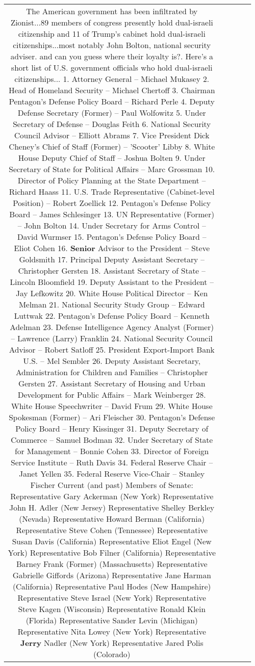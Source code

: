 \documentclass[11pt]{article}
\newlength\mylength
\begin{document}
\begin{center}
\begin{longtable}{|C{.65\mylength}|C{.30\mylength}|C{.12\mylength}|C{.12\mylength}|C{.12\mylength}|}
  \small The American government has been infiltrated by Zionist...89 members of congress presently hold dual-israeli citizenship and 11 of Trump's cabinet hold dual-israeli citizenships...most notably John Bolton, national security adviser. and can you guess where their loyalty is?. Here's a short list of U.S. government officials who hold dual-israeli citizenships... 1. Attorney General – Michael Mukasey 2. Head of Homeland Security – Michael Chertoff 3. Chairman Pentagon's Defense Policy Board – Richard Perle 4. Deputy Defense Secretary (Former) – Paul Wolfowitz 5. Under Secretary of Defense – Douglas Feith 6. National Security Council Advisor – Elliott Abrams 7. Vice President Dick Cheney's Chief of Staff (Former) – 'Scooter' Libby 8. White House Deputy Chief of Staff – Joshua Bolten 9. Under Secretary of State for Political Affairs – Marc Grossman 10. Director of Policy Planning at the State Department – Richard Haass 11. U.S. Trade Representative (Cabinet-level Position) – Robert Zoellick 12. Pentagon's Defense Policy Board – James Schlesinger 13. UN Representative (Former) – John Bolton 14. Under Secretary for Arms Control – David Wurmser 15. Pentagon's Defense Policy Board – Eliot Cohen 16. \textbf{Senior} Advisor to the President – Steve Goldsmith 17. Principal Deputy Assistant Secretary – Christopher Gersten 18. Assistant Secretary of State – Lincoln Bloomfield 19. Deputy Assistant to the President – Jay Lefkowitz 20. White House Political Director – Ken Melman 21. National Security Study Group – Edward Luttwak 22. Pentagon's Defense Policy Board – Kenneth Adelman 23. Defense Intelligence Agency Analyst (Former) – Lawrence (Larry) Franklin 24. National Security Council Advisor – Robert Satloff 25. President Export-Import Bank U.S. – Mel Sembler 26. Deputy Assistant Secretary, Administration for Children and Families – Christopher Gersten 27. Assistant Secretary of Housing and Urban Development for Public Affairs – Mark Weinberger 28. White House Speechwriter – David Frum 29. White House Spokesman (Former) – Ari Fleischer 30. Pentagon's Defense Policy Board – Henry Kissinger 31. Deputy Secretary of Commerce – Samuel Bodman 32. Under Secretary of State for Management – Bonnie Cohen 33. Director of Foreign Service Institute – Ruth Davis 34. Federal Reserve Chair – Janet Yellen 35. Federal Reserve Vice-Chair – Stanley Fischer Current (and past) Members of Senate: Representative Gary Ackerman (New York) Representative John H. Adler (New Jersey) Representative Shelley Berkley (Nevada) Representative Howard Berman (California) Representative Steve Cohen (Tennessee) Representative Susan Davis (California) Representative Eliot Engel (New York) Representative Bob Filner (California) Representative Barney Frank (Former) (Massachusetts) Representative Gabrielle Giffords (Arizona) Representative Jane Harman (California) Representative Paul Hodes (New Hampshire) Representative Steve Israel (New York) Representative Steve Kagen (Wisconsin) Representative Ronald Klein (Florida) Representative Sander Levin (Michigan) Representative Nita Lowey (New York) Representative \textbf{Jerry} Nadler (New York) Representative Jared Polis (Colorado) 
\end{longtable}
\end{center}
\end{document}

